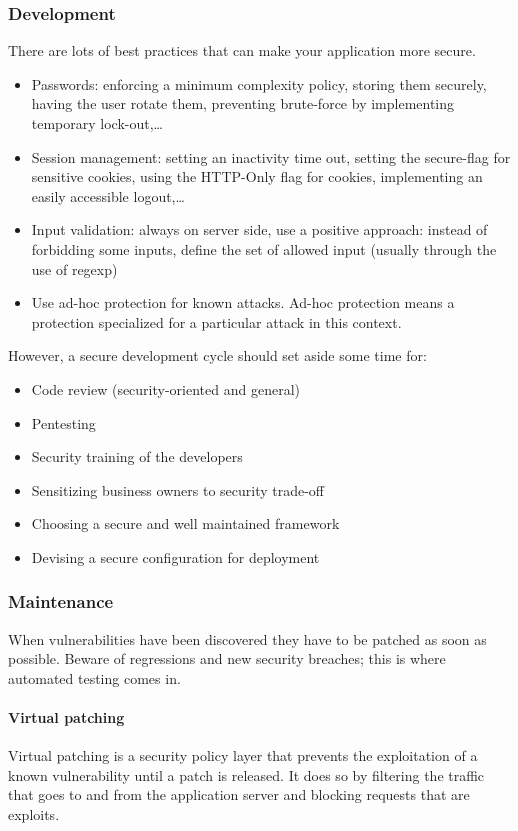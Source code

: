 \subsubsection{Development}

There are lots of best practices that can make your application more secure.
\begin{itemize}
\item Passwords: enforcing a minimum complexity policy, storing them securely,
having the user rotate them, preventing brute-force by implementing temporary
lock-out,\ldots
\item Session management: setting an inactivity time out, setting the
secure-flag for sensitive cookies, using the HTTP-Only flag for cookies,
implementing an easily accessible logout,\ldots
\item Input validation: always on server side, use a positive
  approach: instead of forbidding some inputs, define the set of
  allowed input (usually through the use of regexp)
\item Use ad-hoc protection for known attacks. Ad-hoc protection means a
protection specialized for a particular attack in this context.
\end{itemize}

However, a secure development cycle should set aside some time for:
\begin{itemize}
\item Code review (security-oriented and general)
\item Pentesting
\item Security training of the developers
\item Sensitizing business owners to security trade-off
\item Choosing a secure and well maintained framework
\item Devising a secure configuration for deployment
\end{itemize}

\subsubsection{Maintenance}
When vulnerabilities have been discovered they have to be patched as soon as
possible. Beware of regressions and new security breaches; this is where
automated testing comes in.

\paragraph{Virtual patching}
\label{sec:virtual-patching}
Virtual patching is a security policy layer that prevents the exploitation of
a known vulnerability until a patch is released.
It does so by filtering the traffic that goes to and from the application
server and blocking requests that are exploits.


